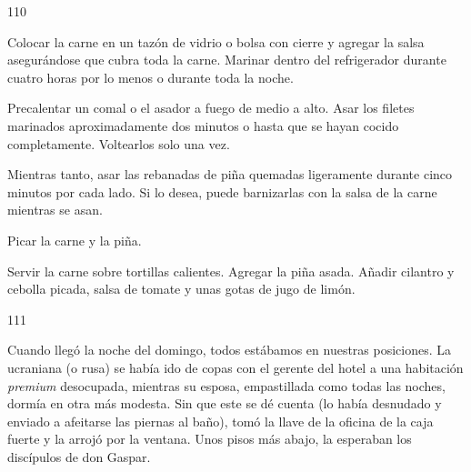 \documentclass[12pt,twoside,openright,a5paper]{book}
\begin{document}
\vspace{0.5cm}

\hrulefill \hspace{0.1cm}\decofourleft\hspace{0.2cm} 110 \hspace{0.2cm}\decofourright \hspace{0.1cm}\hrulefill

\nopagebreak

\vspace{0.5cm}

\nopagebreak

Colocar la carne en un tazón de vidrio o bolsa con cierre y agregar la
salsa asegurándose que cubra toda la carne. Marinar dentro del refrigerador
durante cuatro horas por lo menos o durante toda la noche.

Precalentar un comal o el asador a fuego de medio a alto. Asar los filetes
marinados aproximadamente dos minutos
o hasta que se hayan cocido completamente.
Voltearlos solo una vez.

Mientras tanto, asar las rebanadas de piña quemadas ligeramente
durante cinco minutos por cada lado. Si lo desea, puede barnizarlas con la
salsa de la carne mientras se asan.

Picar la carne y la piña.

Servir la carne sobre tortillas calientes. Agregar la piña asada. Añadir
cilantro y cebolla picada, salsa de tomate y unas gotas de jugo de limón.

\vspace{0.5cm}

\hrulefill \hspace{0.1cm}\decofourleft\hspace{0.2cm} 111 \hspace{0.2cm}\decofourright \hspace{0.1cm}\hrulefill

\nopagebreak

\vspace{0.5cm}

\nopagebreak

Cuando llegó la noche del domingo, todos estábamos en nuestras posiciones.
La ucraniana (o rusa) se había ido de copas con el gerente del hotel
a una habitación \emph{premium} desocupada, mientras su esposa, empastillada como
todas las noches, dormía en otra más modesta. Sin que este se dé cuenta
(lo había desnudado y enviado a afeitarse las piernas al baño), tomó
la llave de la oficina de la caja fuerte y la arrojó por la ventana. Unos
pisos más abajo, la esperaban los discípulos de don Gaspar.
\end{document}
